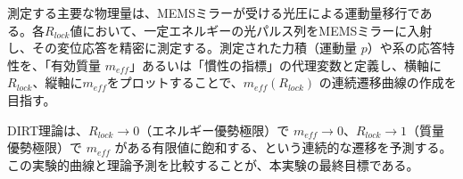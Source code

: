 \documentclass[a4paper,12pt]{article}
\begin{document}
測定する主要な物理量は、MEMSミラーが受ける光圧による運動量移行である。各$R_{lock}$値において、一定エネルギーの光パルス列をMEMSミラーに入射し、その変位応答を精密に測定する。測定された力積（運動量 $p$）や系の応答特性を、「有効質量 $m_{eff}$」あるいは「慣性の指標」の代理変数と定義し、横軸に$R_{lock}$、縦軸に$m_{eff}$をプロットすることで、$m_{eff}(R_{lock})$ の連続遷移曲線の作成を目指す。

DIRT理論は、$R_{lock} \to 0$（エネルギー優勢極限）で $m_{eff} \to 0$、$R_{lock} \to 1$（質量優勢極限）で $m_{eff}$ がある有限値に飽和する、という連続的な遷移を予測する。この実験的曲線と理論予測を比較することが、本実験の最終目標である。
\end{document}
